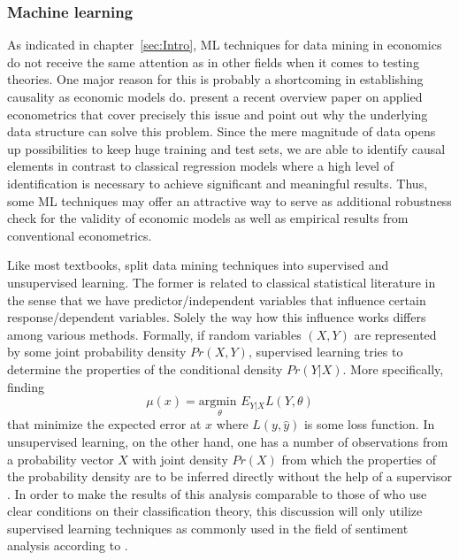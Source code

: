 \subsubsection{Machine learning} %

As indicated in chapter~\ref{sec:Intro}, ML techniques for data mining in economics do not receive the same attention as in other fields when it comes to testing theories. One major reason for this is probably a shortcoming in establishing causality as economic models do. \textcite{Athey.2017} present a recent overview paper on applied econometrics that cover precisely this issue and point out why the underlying data structure can solve this problem. Since the mere magnitude of data opens up possibilities to keep huge training and test sets, we are able to identify causal elements in contrast to classical regression models where a high level of identification is necessary to achieve significant and meaningful results. Thus, some ML techniques may offer an attractive way to serve as additional robustness check for the validity of economic models as well as empirical results from conventional econometrics. 

Like most textbooks, \textcite{Friedman.2001} split data mining techniques into supervised and unsupervised learning. The former is related to classical statistical literature in the sense that we have predictor/independent variables that influence certain response/dependent variables. Solely the way how this influence works differs among various methods. Formally, if random variables $(X,Y)$ are represented by some joint probability density $Pr(X,Y)$, supervised learning tries to determine the properties of the conditional density $Pr(Y|X) $. More specifically, finding 
%
\begin{equation*}
	\mu(x) = \underset{\theta}{\text{argmin }} E_{Y|X} L(Y,\theta)
\end{equation*}
%
that minimize the expected error at $x$ where $L(y,\hat{y})$ is some loss function. In unsupervised learning, on the other hand, one has a number of observations from a probability vector $X$ with joint density $Pr(X)$ from which the properties of the probability density are to be inferred directly without the help of a supervisor \parencite[pp.~485-486]{Friedman.2001}. In order to make the results of this analysis comparable to those of \textcite{Ellingsen.2003} who use clear conditions on their classification theory, this discussion will only utilize supervised learning techniques as commonly used in the field of sentiment analysis according to \textcite{Wiebe.1999}. 

